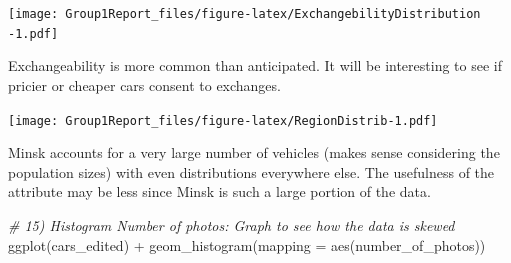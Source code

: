 \documentclass[
]{article}
\newenvironment{Shaded}{\begin{snugshade}}{\end{snugshade}}
\newcommand{\AttributeTok}[1]{\textcolor[rgb]{0.77,0.63,0.00}{#1}}
\newcommand{\CommentTok}[1]{\textcolor[rgb]{0.56,0.35,0.01}{\textit{#1}}}
\newcommand{\DecValTok}[1]{\textcolor[rgb]{0.00,0.00,0.81}{#1}}
\newcommand{\FloatTok}[1]{\textcolor[rgb]{0.00,0.00,0.81}{#1}}
\newcommand{\FunctionTok}[1]{\textcolor[rgb]{0.00,0.00,0.00}{#1}}
\newcommand{\NormalTok}[1]{#1}
\newcommand{\OtherTok}[1]{\textcolor[rgb]{0.56,0.35,0.01}{#1}}
\newcommand{\SpecialCharTok}[1]{\textcolor[rgb]{0.00,0.00,0.00}{#1}}
\newcommand{\StringTok}[1]{\textcolor[rgb]{0.31,0.60,0.02}{#1}}
\begin{document}
\texttt{[image: Group1Report\_files/figure-latex/ExchangebilityDistribution -1.pdf]}

Exchangeability is more common than anticipated. It will be interesting
to see if pricier or cheaper cars consent to exchanges.

\begin{Shaded}
\end{Shaded}

\texttt{[image: Group1Report\_files/figure-latex/RegionDistrib-1.pdf]}

Minsk accounts for a very large number of vehicles (makes sense
considering the population sizes) with even distributions everywhere
else. The usefulness of the attribute may be less since Minsk is such a
large portion of the data.

\begin{Shaded}
\begin{Highlighting}[]
\CommentTok{\# 15) Histogram Number of photos: Graph to see how the data is skewed}
\FunctionTok{ggplot}\NormalTok{(cars\_edited) }\SpecialCharTok{+} \FunctionTok{geom\_histogram}\NormalTok{(}\AttributeTok{mapping =} \FunctionTok{aes}\NormalTok{(number\_of\_photos))}
\end{Highlighting}
\end{Shaded}
\end{document}
